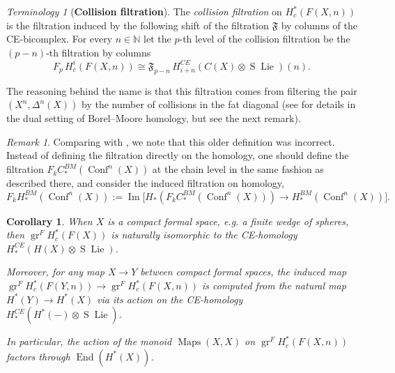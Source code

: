 \documentclass[12pt]{article}
\newcommand{\N}{\mathbb{N}}
\newcommand{\EndSpace}[1]{\operatorname{Maps}({#1},{#1})}
\DeclareMathOperator{\End}{End}
\DeclareMathOperator{\gr}{gr}
\DeclareMathOperator{\Lie}{Lie}
\DeclareMathOperator{\Suspension}{S}
\theoremstyle{plain}
\newtheorem{cor}[thm]{Corollary}
\theoremstyle{definition}
\theoremstyle{remark}
\newtheorem{rmk}[thm]{Remark}
\newtheorem{terminology}[thm]{Terminology}
\begin{document}
\begin{terminology}[\textbf{Collision filtration}]\label{terminology:collision}
The \emph{collision filtration} on $H^{*}_c(F(X,n))$ is the filtration induced by the following shift of the filtration $\mathfrak{F}$ by columns of the CE-bicomplex. For every $n\in \N$ let the $p$-th level of the collision filtration be the $(p-n)$-th filtration by columns
\[
F_p\, H_c^{i}(F(X,n)) \cong \mathfrak{F}_{p-n}\, H_{i+n}^{CE}(C(X)\otimes\Suspension\Lie)(n).
\]
\end{terminology}
The reasoning behind the name is that this filtration comes from filtering the pair %
$(X^n, \Delta^n(X))$ by the number of collisions in the fat diagonal (see \cite[\S3.7]{BG} for details in the dual setting of Borel--Moore homology, but see the next remark).

\begin{rmk}
    Comparing with \cite[Definition 3.7.1]{BG}, we note that this older definition was incorrect. Instead of defining the filtration directly on the homology, one should define the filtration $F_k C_*^{BM}(\operatorname{Conf}^n(X))$ at the chain level in the same fashion as described there, and consider the induced filtration on homology,
    \[
        F_k H_*^{BM}(\operatorname{Conf}^n(X)) := \operatorname{Im}\big[H_*(F_k C_*^{BM}(\operatorname{Conf}^n(X))) \to H_*^{BM}(\operatorname{Conf}^n(X))\big].
    \]
\end{rmk}

\begin{cor} \label{cor:factoring through homological action}
    When $X$ is a compact formal space, e.g. a finite wedge of spheres, then
    $\gr^F H_c^{*}(F(X))$ is naturally isomorphic to the CE-homology $H^{CE}_{*}( H(X) \otimes \Suspension\Lie )$. 
    
    Moreover, for any map $X\to Y$ between compact formal spaces, the induced map $\gr^F H^*_c(F(Y,n)) \to \gr^F H^*_c(F(X,n))$ is computed 
    from the natural map $H^*(Y) \to H^*(X)$ via its action on the CE-homology $H^{CE}_*( H^*(-)\otimes \Suspension\Lie)$.

    In particular, the action of the monoid $\EndSpace{X}$
    on $\gr^F H^*_c(F(X,n))$ factors through $\End(H^*(X))$.
\end{cor}
\end{document}
